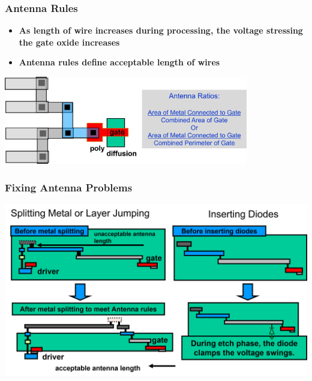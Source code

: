 \documentclass[compress]{beamer}
\begin{document}
\begin{frame}
	\frametitle{Antenna Rules}
	\begin{itemize}
		\item \textbf{As length of wire increases during processing, the
		voltage stressing the gate oxide increases}
		\item \textbf{Antenna rules define acceptable length of wires}
	\end{itemize}
\begin{center}
	\includegraphics[width=0.8\textwidth]{Rules}
\end{center}
\end{frame}

\begin{frame}
	\frametitle{Fixing Antenna Problems}
	\begin{center}
		\includegraphics[width=\textwidth]{Fixing}
	\end{center}
\end{frame}
\end{document}
